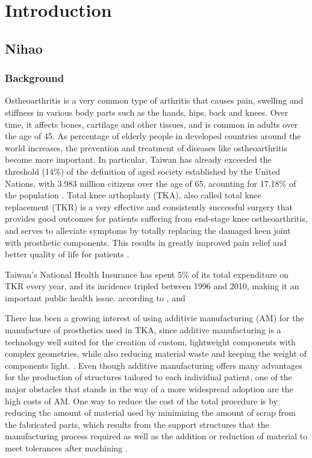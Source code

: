 \documentclass[../main.tex]{subfiles}
\begin{document}
	
\chapter{Introduction}
\section{Nihao}
 
 \subsection{Background}
 
 Ostheoarthritis is a very common type of arthritis that causes pain, swelling and stiffness in various body parts such as the hands, hips, back and knees. Over time, it affects bones, cartilage and other tissues, and is common in adults over the age of 45. As percentage of elderly people in developed countries around the world increases, the prevention and treatment of diseases like ostheoarthritis become more important. In particular,  Taiwan has already  exceeded the threshold (14\%) of the definition of aged society established by the United Nations, with 3.983 million citizens over the age of 65, acounting for 17.18\% of the population \cite{ElderlyDisadvantagedSituation2024}. Total knee arthoplasty (TKA), also called total knee replacement (TKR) is a very effective and consistently successful surgery that provides good outcomes for patients suffering from end-stage knee ostheoarthritis, and serves to alleviate symptoms by totally replacing the damaged keen joint with prosthetic components. This results in greatly improved pain relief and better quality of life for patients \cite{varacalloTotalKneeArthroplasty2025}.
 
 Taiwan's National Health Insurance has spent 5\% of its total expenditure on TKR every year, and its incidence tripled between 1996 and 2010, making it an important public health issue.   according to \cite{linIncreaseTotalKnee2018}, and
 
There has been a growing interest of using additivie manufacturing (AM) for the manufacture of prosthetics used in TKA, since additive manufacturing is a technology well suited for the creation of custom, lightweight components with complex geometries, while also reducing material waste and keeping the weight of components light. \cite{narraAdditiveManufacturingTotal2019}. Even though additive manufacturing offers many advantages for the production of structures tailored to each individual patient, one of the major obstacles that stands in the way of a more widespread adoption are the high costs of AM. One way to reduce the cost of the total procedure is by reducing the amount of material used by minimizing the amount of scrap from the fabricated parts, which results from the support structures that the manufacturing process required as well as the addition or reduction of material to meet tolerances after machining \cite{narraAdditiveManufacturingTotal2019} \cite{MetalAdditiveManufacturing} . 
\end{document}
